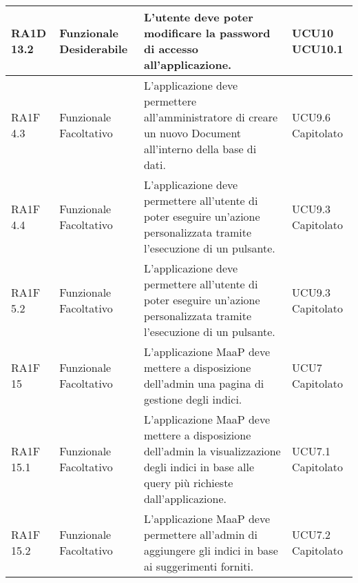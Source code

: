 \begin{center}
\begin{longtable}{ | l | p{2cm} | p{5cm} | p{1.7cm} |}
        RA1D 13.2 & Funzionale \newline  Desiderabile  & L'utente deve poter modificare la password di accesso all'applicazione. &  UCU10 \newline  UCU10.1 \newline  \\ \hline      
        RA1F 4.3 & Funzionale \newline  Facoltativo  & L'applicazione deve permettere all'amministratore di creare un nuovo Document all'interno della base di dati. &  UCU9.6 \newline  Capitolato \newline  \\ \hline      
        RA1F 4.4 & Funzionale \newline  Facoltativo  & L'applicazione deve permettere all'utente di poter eseguire un'azione personalizzata tramite l'esecuzione di un pulsante. &  UCU9.3 \newline  Capitolato \newline  \\ \hline      
        RA1F 5.2 & Funzionale \newline  Facoltativo  & L'applicazione deve permettere all'utente di poter eseguire un'azione personalizzata tramite l'esecuzione di un pulsante. &  UCU9.3 \newline  Capitolato \newline  \\ \hline      
        RA1F 15 & Funzionale \newline  Facoltativo  & L'applicazione MaaP deve mettere a disposizione dell'admin una pagina di gestione degli indici. &  UCU7 \newline  Capitolato \newline  \\ \hline      
        RA1F 15.1 & Funzionale \newline  Facoltativo  & L'applicazione MaaP deve mettere a disposizione dell'admin la visualizzazione degli indici in base alle query più richieste dall'applicazione. &  UCU7.1 \newline  Capitolato \newline  \\ \hline      
        RA1F 15.2 & Funzionale \newline  Facoltativo  & L'applicazione MaaP deve permettere all'admin di aggiungere gli indici in base ai suggerimenti forniti. &  UCU7.2 \newline  Capitolato \newline  \\ \hline      

\end{longtable}
\end{center}
